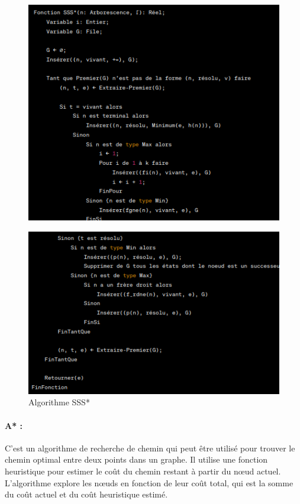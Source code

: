 \documentclass[12pt]{article}
\begin{document}
		\begin{figure}[H]
		\centering
		\includegraphics[scale=0.7]{img/sss1}
	\end{figure}
		\begin{figure}[H]
		\centering
		\includegraphics[scale=0.7]{img/sss2}
		\caption{Algorithme SSS* }
		\label{Algorithme SSS*}
	\end{figure}
	
\paragraph{	A* :} C'est un algorithme de recherche de chemin qui peut être utilisé pour trouver le chemin optimal entre deux points dans un graphe. Il utilise une fonction heuristique pour estimer le coût du chemin restant à partir du nœud actuel. L'algorithme explore les nœuds en fonction de leur coût total, qui est la somme du coût actuel et du coût heuristique estimé.
\end{document}

